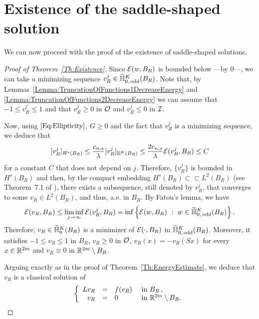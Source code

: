 \section{Existence of the saddle-shaped solution}
\label{Sec:Existence}





We can now proceed with the proof of the existence of saddle-shaped solutions.

\begin{proof}[Proof of Theorem~\ref{Th:Existence}]
Since $\mathcal{E}(w,B_R)$ is bounded below ---by $0$---, we can take a minimizing sequence $v_R^j\in \widetilde{\mathbb{H}}^K_{0, \,\mathrm{odd}}(B_R)$. Note that, by Lemmas~\ref{Lemma:TruncationOfFunctions1DecreaseEnergy} and \ref{Lemma:TruncationOfFunctions2DecreaseEnergy} we can assume that $-1 \leq v_R^j \leq 1$ and that $v_R^j \geq 0$ in $\mathcal{O}$ and $v_R^j \leq 0$ in $\mathcal{I}$. 

Now, using $\eqref{Eq:Ellipticity}$, $G\geq 0$ and the fact that $v_R^j$ is a minimizing sequence, we deduce that 
$$
[v_R^j]_{H^s(B_R)} \leq \dfrac{c_{n,s}}{\lambda}  [v_R^j]_{\mathbb{H}^K(B_R)}\leq \dfrac{2 c_{n,s}}{\lambda}\mathcal{E}(v_R^j,B_R) \leq C
$$
for a constant $C$ that does not depend on $j$. Therefore, $\{v_R^j\}$ is bounded in $H^s(B_R)$ and then, by the compact embedding $H^s(B_R) \subset \subset L^2(B_R)$ (see Theorem~7.1 of \cite{HitchhikerGuide}), there exists a subsequence, still denoted by $v_R^j$,  that converges to some $v_R \in L^2(B_R)$, and thus, a.e. in $B_R$. By Fatou's lemma, we have
$$
\mathcal{E}(v_R, B_R)
\leq \liminf_{j\to \infty} \mathcal{E}(v_R^j, B_R) = \inf \left \{ \mathcal{E}(w, B_R) \ : \ w \in \widetilde{\mathbb{H}}^K_{0, \,\mathrm{odd}}(B_R) \right \}.
$$
Therefore, $v_R \in \widetilde{\mathbb{H}}^K_0(B_R)$ is a minimizer of $\mathcal{E}(\cdot, B_R)$ in $\widetilde{\mathbb{H}}^K_{0, \,\mathrm{odd}}(B_R)$. Moreover, it satisfies $-1\leq v_R \leq 1$ in $B_R$, $v_R\geq 0$ in $\mathcal{O}$, $v_R(x) = - v_R(Sx)$ for every $x\in \mathbb{R}^{2m}$ and $v_R \equiv 0 $ in $\mathbb{R}^{2m} \setminus B_R$.

Arguing exactly as in the proof of Theorem~\ref{Th:EnergyEstimate}, we deduce that $v_R$ is a classical solution of
\begin{equation}
\label{Eq:ProofExistenceProblemBR}
	\left\{\begin{array}{rcll}
	L v_R &=& f(v_R) & \textrm{ in } B_R\,,\\
	v_R &=& 0 & \textrm{ in }\mathbb{R}^{2m} \setminus B_R.
	\end{array} \right.
\end{equation}



\end{proof}
